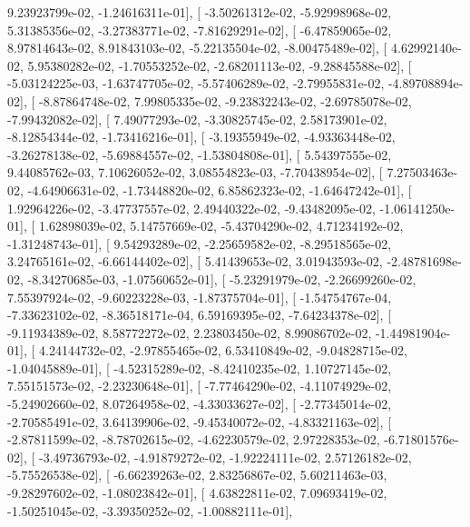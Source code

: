 \documentclass{article}
\begin{document}
          9.23923799e-02,  -1.24616311e-01],
       [ -3.50261312e-02,  -5.92998968e-02,   5.31385356e-02,
         -3.27383771e-02,  -7.81629291e-02],
       [ -6.47859065e-02,   8.97814643e-02,   8.91843103e-02,
         -5.22135504e-02,  -8.00475489e-02],
       [  4.62992140e-02,   5.95380282e-02,  -1.70553252e-02,
         -2.68201113e-02,  -9.28845588e-02],
       [ -5.03124225e-03,  -1.63747705e-02,  -5.57406289e-02,
         -2.79955831e-02,  -4.89708894e-02],
       [ -8.87864748e-02,   7.99805335e-02,  -9.23832243e-02,
         -2.69785078e-02,  -7.99432082e-02],
       [  7.49077293e-02,  -3.30825745e-02,   2.58173901e-02,
         -8.12854344e-02,  -1.73416216e-01],
       [ -3.19355949e-02,  -4.93363448e-02,  -3.26278138e-02,
         -5.69884557e-02,  -1.53804808e-01],
       [  5.54397555e-02,   9.44085762e-03,   7.10626052e-02,
          3.08554823e-03,  -7.70438954e-02],
       [  7.27503463e-02,  -4.64906631e-02,  -1.73448820e-02,
          6.85862323e-02,  -1.64647242e-01],
       [  1.92964226e-02,  -3.47737557e-02,   2.49440322e-02,
         -9.43482095e-02,  -1.06141250e-01],
       [  1.62898039e-02,   5.14757669e-02,  -5.43704290e-02,
          4.71234192e-02,  -1.31248743e-01],
       [  9.54293289e-02,  -2.25659582e-02,  -8.29518565e-02,
          3.24765161e-02,  -6.66144402e-02],
       [  5.41439653e-02,   3.01943593e-02,  -2.48781698e-02,
         -8.34270685e-03,  -1.07560652e-01],
       [ -5.23291979e-02,  -2.26699260e-02,   7.55397924e-02,
         -9.60223228e-03,  -1.87375704e-01],
       [ -1.54754767e-04,  -7.33623102e-02,  -8.36518171e-04,
          6.59169395e-02,  -7.64234378e-02],
       [ -9.11934389e-02,   8.58772272e-02,   2.23803450e-02,
          8.99086702e-02,  -1.44981904e-01],
       [  4.24144732e-02,  -2.97855465e-02,   6.53410849e-02,
         -9.04828715e-02,  -1.04045889e-01],
       [ -4.52315289e-02,  -8.42410235e-02,   1.10727145e-02,
          7.55151573e-02,  -2.23230648e-01],
       [ -7.77464290e-02,  -4.11074929e-02,  -5.24902660e-02,
          8.07264958e-02,  -4.33033627e-02],
       [ -2.77345014e-02,  -2.70585491e-02,   3.64139906e-02,
         -9.45340072e-02,  -4.83321163e-02],
       [ -2.87811599e-02,  -8.78702615e-02,  -4.62230579e-02,
          2.97228353e-02,  -6.71801576e-02],
       [ -3.49736793e-02,  -4.91879272e-02,  -1.92224111e-02,
          2.57126182e-02,  -5.75526538e-02],
       [ -6.66239263e-02,   2.83256867e-02,   5.60211463e-03,
         -9.28297602e-02,  -1.08023842e-01],
       [  4.63822811e-02,   7.09693419e-02,  -1.50251045e-02,
         -3.39350252e-02,  -1.00882111e-01],
\end{document}
